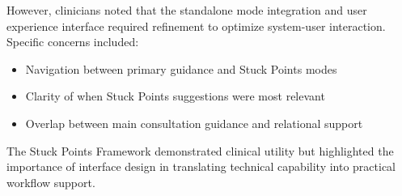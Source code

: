 However, clinicians noted that the standalone mode integration and user experience interface required refinement to optimize system-user interaction. Specific concerns included:
\begin{itemize}
    \item Navigation between primary guidance and Stuck Points modes
    \item Clarity of when Stuck Points suggestions were most relevant
    \item Overlap between main consultation guidance and relational support
\end{itemize}

The Stuck Points Framework demonstrated clinical utility but highlighted the importance of interface design in translating technical capability into practical workflow support.


